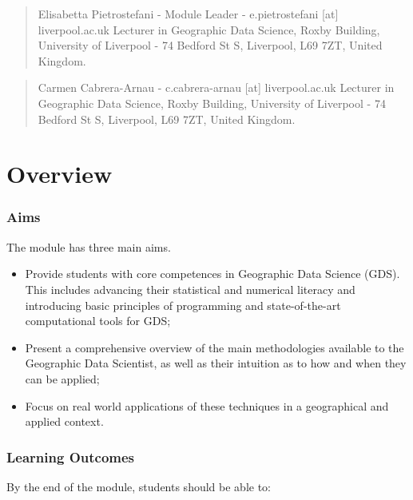 \documentclass[
  letterpaper,
  DIV=11,
  numbers=noendperiod]{scrreprt}
\begin{document}

\begin{quote}
Elisabetta Pietrostefani - Module Leader - e.pietrostefani {[}at{]}
liverpool.ac.uk Lecturer in Geographic Data Science, Roxby Building,
University of Liverpool - 74 Bedford St S, Liverpool, L69 7ZT, United
Kingdom.
\end{quote}

\begin{quote}
Carmen Cabrera-Arnau - c.cabrera-arnau {[}at{]} liverpool.ac.uk Lecturer
in Geographic Data Science, Roxby Building, University of Liverpool - 74
Bedford St S, Liverpool, L69 7ZT, United Kingdom.
\end{quote}

\part{Overview}

\section*{Aims}\label{aims}


The module has three main aims.

\begin{itemize}
\item
  Provide students with core competences in Geographic Data Science
  (GDS). This includes advancing their statistical and numerical
  literacy and introducing basic principles of programming and
  state-of-the-art computational tools for GDS;
\item
  Present a comprehensive overview of the main methodologies available
  to the Geographic Data Scientist, as well as their intuition as to how
  and when they can be applied;
\item
  Focus on real world applications of these techniques in a geographical
  and applied context.
\end{itemize}

\section*{Learning Outcomes}\label{learning-outcomes}


By the end of the module, students should be able to:
\end{document}
